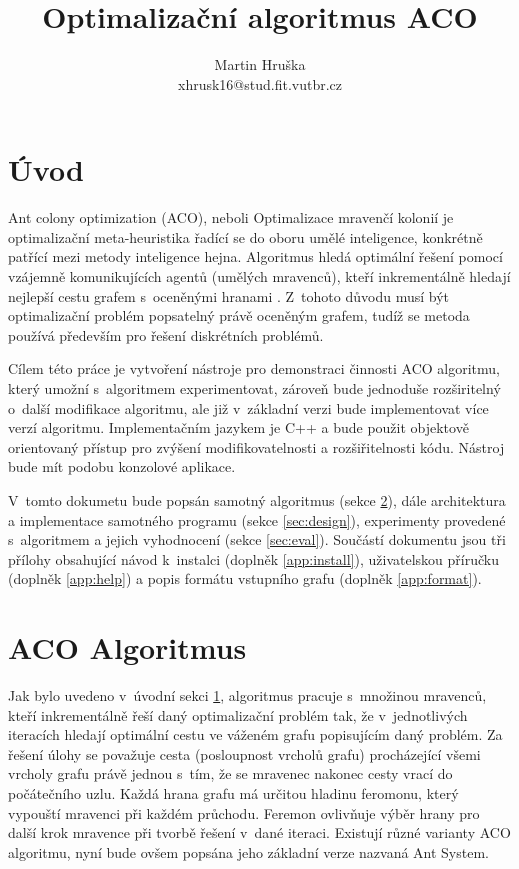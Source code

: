 \documentclass[a4paper, 12pt]{article}
\title{Optimalizační algoritmus ACO}
\author{Martin Hruška\\xhrusk16@stud.fit.vutbr.cz}
\date{}
\begin{document}
\maketitle

\section{Úvod}
\label{sec:intro}
Ant colony optimization (ACO), neboli Optimalizace mravenčí kolonií je optimalizační meta-heuristika řadící se do oboru umělé inteligence,
konkrétně patřící mezi metody inteligence hejna. Algoritmus hledá optimální řešení pomocí vzájemně komunikujících agentů (umělých mravenců), kteří
inkrementálně hledají nejlepší cestu grafem s~oceněnými hranami \cite{aco:main}. 
Z~tohoto důvodu musí být optimalizační problém popsatelný právě oceněným grafem, tudíž se metoda používá především pro řešení diskrétních problémů.

Cílem této práce je vytvoření nástroje pro demonstraci činnosti ACO algoritmu, který umožní s~algoritmem experimentovat, zároveň bude jednoduše rozširitelný
o~další modifikace algoritmu, ale již v~základní verzi bude implementovat více verzí algoritmu. Implementačním jazykem je C++ a bude použit objektově orientovaný
přístup pro zvýšení modifikovatelnosti a rozšiřitelnosti kódu. Nástroj bude mít podobu konzolové aplikace.

V~tomto dokumetu bude popsán samotný algoritmus (sekce \ref{sec:algorithm}), dále architektura a implementace samotného programu (sekce \ref{sec:design}),
experimenty provedené s~algoritmem a jejich vyhodnocení (sekce \ref{sec:eval}).
Součástí dokumentu jsou tři přílohy obsahující návod k~instalci (doplněk \ref{app:install}),
uživatelskou příručku (doplněk \ref{app:help}) a popis formátu vstupního grafu (doplněk \ref{app:format}).

\section{ACO Algoritmus}
\label{sec:algorithm}
Jak bylo uvedeno v~úvodní sekci \ref{sec:intro}, algoritmus pracuje s~množinou mravenců, kteří inkrementálně řeší daný optimalizační problém tak, že
v~jednotlivých iteracích hledají optimální cestu ve váženém grafu popisujícím daný problém. Za řešení úlohy se považuje cesta (posloupnost vrcholů grafu)
procházející všemi vrcholy grafu právě
jednou s~tím, že se mravenec nakonec cesty vrací do počátečního uzlu. Každá hrana grafu má určitou hladinu feromonu, který vypouští mravenci při každém průchodu.
Feremon  ovlivňuje výběr hrany pro další krok mravence při tvorbě řešení v~dané iteraci.
Existují různé varianty ACO algoritmu, nyní bude ovšem popsána jeho základní verze nazvaná Ant System.
\end{document}
